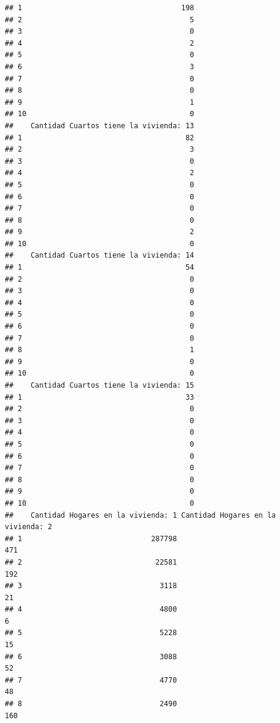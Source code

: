 \documentclass[11pt,]{article}
\begin{document}
\begin{verbatim}
## 1                                     198
## 2                                       5
## 3                                       0
## 4                                       2
## 5                                       0
## 6                                       3
## 7                                       0
## 8                                       0
## 9                                       1
## 10                                      0
##    Cantidad Cuartos tiene la vivienda: 13
## 1                                      82
## 2                                       3
## 3                                       0
## 4                                       2
## 5                                       0
## 6                                       0
## 7                                       0
## 8                                       0
## 9                                       2
## 10                                      0
##    Cantidad Cuartos tiene la vivienda: 14
## 1                                      54
## 2                                       0
## 3                                       0
## 4                                       0
## 5                                       0
## 6                                       0
## 7                                       0
## 8                                       1
## 9                                       0
## 10                                      0
##    Cantidad Cuartos tiene la vivienda: 15
## 1                                      33
## 2                                       0
## 3                                       0
## 4                                       0
## 5                                       0
## 6                                       0
## 7                                       0
## 8                                       0
## 9                                       0
## 10                                      0
##    Cantidad Hogares en la vivienda: 1 Cantidad Hogares en la vivienda: 2
## 1                              287798                                471
## 2                               22581                                192
## 3                                3118                                 21
## 4                                4800                                  6
## 5                                5228                                 15
## 6                                3088                                 52
## 7                                4770                                 48
## 8                                2490                                160

\end{verbatim}
\end{document}
